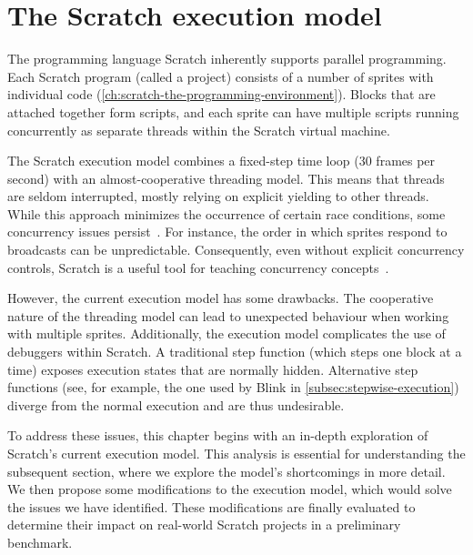 \documentclass[../main]{subfiles}
\begin{document}
\chapter{The Scratch execution model}\label{ch:scratch-execution-model}


The programming language Scratch inherently supports parallel programming.
Each Scratch program (called a project) consists of a number of sprites with individual code (\cref{ch:scratch-the-programming-environment}).
Blocks that are attached together form scripts, and each sprite can have multiple scripts running concurrently as separate threads within the Scratch virtual machine.

The Scratch execution model combines a fixed-step time loop (30 frames per second) with an almost-cooperative threading model.
This means that threads are seldom interrupted, mostly relying on explicit yielding to other threads.
While this approach minimizes the occurrence of certain race conditions, some concurrency issues persist~\autocite{maloneyScratchProgrammingLanguage2010}.
For instance, the order in which sprites respond to broadcasts can be unpredictable.
Consequently, even without explicit concurrency controls, Scratch is a useful tool for teaching concurrency concepts~\autocite{fatourouTeachingConcurrentProgramming2018}.

However, the current execution model has some drawbacks.
The cooperative nature of the threading model can lead to unexpected behaviour when working with multiple sprites.
Additionally, the execution model complicates the use of debuggers within Scratch.
A traditional step function (which steps one block at a time) exposes execution states that are normally hidden.
Alternative step functions (see, for example, the one used by Blink in \cref{subsec:stepwise-execution}) diverge from the normal execution and are thus undesirable.

To address these issues, this chapter begins with an in-depth exploration of Scratch's current execution model.
This analysis is essential for understanding the subsequent section, where we explore the model's shortcomings in more detail.
We then propose some modifications to the execution model, which would solve the issues we have identified.
These modifications are finally evaluated to determine their impact on real-world Scratch projects in a preliminary benchmark.
\end{document}
